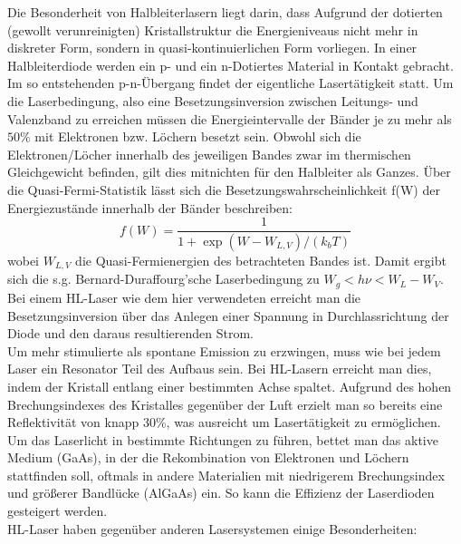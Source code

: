 \documentclass[twoside,colorback,accentcolor=tud4c,11pt]{tudreport}
\begin{document}
Die Besonderheit von Halbleiterlasern liegt darin, dass Aufgrund der dotierten (gewollt verunreinigten) Kristallstruktur die Energieniveaus nicht mehr in diskreter Form, sondern in quasi-kontinuierlichen Form vorliegen. In einer Halbleiterdiode werden ein p- und ein n-Dotiertes Material in Kontakt gebracht. Im so entstehenden p-n-Übergang findet der eigentliche Lasertätigkeit statt. Um die Laserbedingung, also eine Besetzungsinversion zwischen Leitungs- und Valenzband zu erreichen müssen die Energieintervalle der Bänder je zu mehr als $50\%$ mit Elektronen bzw. Löchern besetzt sein. Obwohl sich die Elektronen/Löcher innerhalb des jeweiligen Bandes zwar im thermischen Gleichgewicht befinden, gilt dies mitnichten für den Halbleiter als Ganzes. Über die Quasi-Fermi-Statistik lässt sich die Besetzungswahrscheinlichkeit f(W) der Energiezustände innerhalb der Bänder beschreiben:
\begin{equation}
f(W)=\frac{1}{1+\exp\left(W-W_{L,V}\right)/ (k_{b}T)}
\end{equation}
wobei $W_{L,V}$ die Quasi-Fermienergien des betrachteten Bandes ist. Damit ergibt sich die s.g. Bernard-Duraffourg'sche Laserbedingung zu $W_{g}<h\nu <W_{L}-W_{V}$. Bei einem HL-Laser wie dem hier verwendeten erreicht man die Besetzungsinversion über das Anlegen einer Spannung in Durchlassrichtung der Diode und den daraus resultierenden Strom. \\
Um mehr stimulierte als spontane Emission zu erzwingen, muss wie bei jedem Laser ein Resonator Teil des Aufbaus sein. Bei HL-Lasern erreicht man dies, indem der Kristall entlang einer bestimmten Achse spaltet. Aufgrund des hohen Brechungsindexes des Kristalles gegenüber der Luft erzielt man so bereits eine Reflektivität von knapp 30\%, was ausreicht um Lasertätigkeit zu ermöglichen. Um das Laserlicht in bestimmte Richtungen zu führen, bettet man das aktive Medium (GaAs), in der die Rekombination von Elektronen und Löchern stattfinden soll, oftmals in andere Materialien mit niedrigerem Brechungsindex und größerer Bandlücke (AlGaAs) ein. So kann die Effizienz der Laserdioden gesteigert werden.\\
HL-Laser haben gegenüber anderen Lasersystemen einige Besonderheiten:
\end{document}
